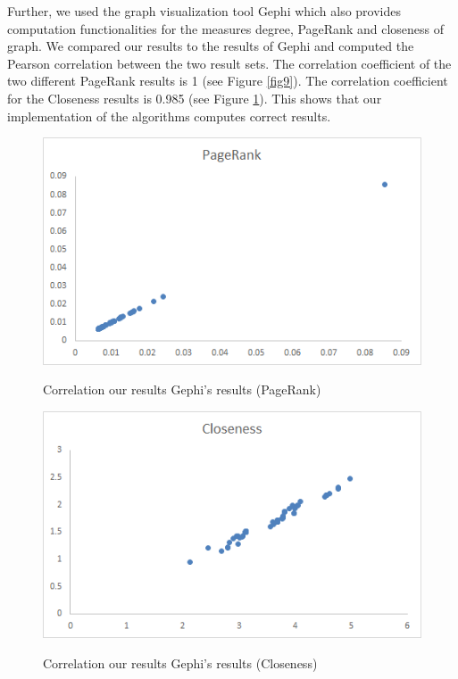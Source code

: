 Further, we used the graph visualization tool Gephi which also provides computation functionalities for the measures degree, PageRank and closeness of graph. We compared our results to the results of Gephi and computed the Pearson correlation between the two result sets.
The correlation coefficient of the two different PageRank results is 1 (see Figure \ref{fig9}). The correlation coefficient for the Closeness results is 0.985 (see Figure \ref{fig10}). This shows that our implementation of the algorithms computes correct results.

\begin{figure}[h]
\begin{minipage}{.5\textwidth}
	\begin{center}
		\label{fig9}		
		\includegraphics[width=1.0\textwidth]{fig9}	
		\caption{Correlation our results Gephi’s results (PageRank)}	
	\end{center}
\end{minipage} %
\begin{minipage}{.5\textwidth}
	\begin{center}
		\label{fig10}		
		\includegraphics[width=1.0\textwidth]{fig10}	
		\caption{Correlation our results Gephi’s results (Closeness)}	
	\end{center}
\end{minipage}
\end{figure}

